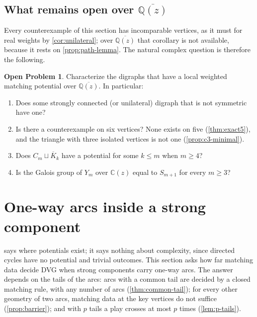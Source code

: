 \documentclass[11pt]{amsart}
\theoremstyle{plain}
\theoremstyle{definition}
\newtheorem{problem}[theorem]{Open Problem}
\theoremstyle{remark}
\numberwithin{equation}{section}
\newcommand{\QQ}{\mathbb{Q}}
\newcommand{\CC}{\mathbb{C}}
\newcommand{\Qzbar}{\overline{\QQ(z)}}
\begin{document}
\subsection{What remains open over \texorpdfstring{$\Qzbar$}{the algebraic closure}}
Every counterexample of this section has incomparable vertices, as it must for real weights by \cref{cor:unilateral}; over $\Qzbar$ that corollary is not available, because it rests on \cref{prop:path-lemma}. The natural complex question is therefore the following.

\begin{problem}\label{prob:complex}
Characterize the digraphs that have a local weighted matching potential over $\Qzbar$. In particular:
\begin{enumerate}[label=\textup{(\alph*)}]
\item Does some strongly connected \textup{(}or unilateral\textup{)} digraph that is not symmetric have one?
\item Is there a counterexample on six vertices? None exists on five (\cref{thm:exact5}), and the triangle with three isolated vertices is not one (\cref{prop:c3-minimal}).
\item Does $C_m\sqcup\overline{K}_k$ have a potential for some $k\le m$ when $m\ge4$?
\item Is the Galois group of $Y_m$ over $\CC(z)$ equal to $S_{m+1}$ for every $m\ge3$?
\end{enumerate}
\end{problem}

\section{One-way arcs inside a strong component}\label{sec:oneway}

 says where potentials exist; it says nothing about complexity, since directed cycles have no potential and trivial outcomes. This section asks how far matching data decide DVG when strong components carry one-way arcs. The answer depends on the tails of the arcs: arcs with a common tail are decided by a closed matching rule, with any number of arcs (\cref{thm:common-tail}); for every other geometry of two arcs, matching data at the key vertices do not suffice (\cref{prop:barrier}); and with $p$ tails a play crosses at most $p$ times (\cref{lem:p-tails}).
\end{document}
